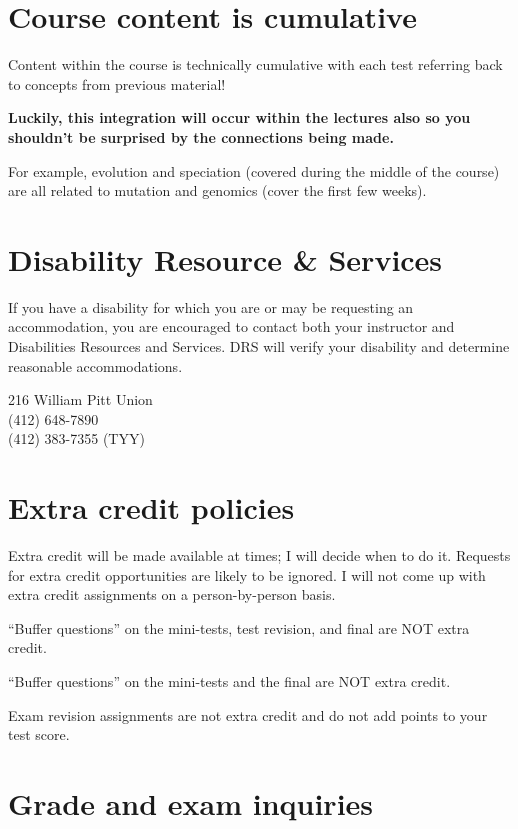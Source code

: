 \documentclass[
]{book}
\begin{document}
\hypertarget{course-content-is-cumulative}{%
\chapter{Course content is cumulative}\label{course-content-is-cumulative}}

Content within the course is technically cumulative with each test referring back to concepts from previous material!

\textbf{Luckily, this integration will occur within the lectures also so you shouldn't be surprised by the connections being made.}

For example, evolution and speciation (covered during the middle of the course) are all related to mutation and genomics (cover the first few weeks).

\hypertarget{DRS}{%
\chapter{Disability Resource \& Services}\label{DRS}}

If you have a disability for which you are or may be requesting an accommodation, you are encouraged to contact both your instructor and Disabilities Resources and Services. DRS will verify your disability and determine reasonable accommodations.

216 William Pitt Union\\
(412) 648-7890\\
(412) 383-7355 (TYY)

\hypertarget{extracredit}{%
\chapter{Extra credit policies}\label{extracredit}}

Extra credit will be made available at times; I will decide when to do it. Requests for extra credit opportunities are likely to be ignored. I will not come up with extra credit assignments on a person-by-person basis.

``Buffer questions'' on the mini-tests, test revision, and final are NOT extra credit.

``Buffer questions'' on the mini-tests and the final are NOT extra credit.

Exam revision assignments are not extra credit and do not add points to your test score.

\hypertarget{grade-and-exam-inquiries}{%
\chapter{Grade and exam inquiries}\label{grade-and-exam-inquiries}}
\end{document}
